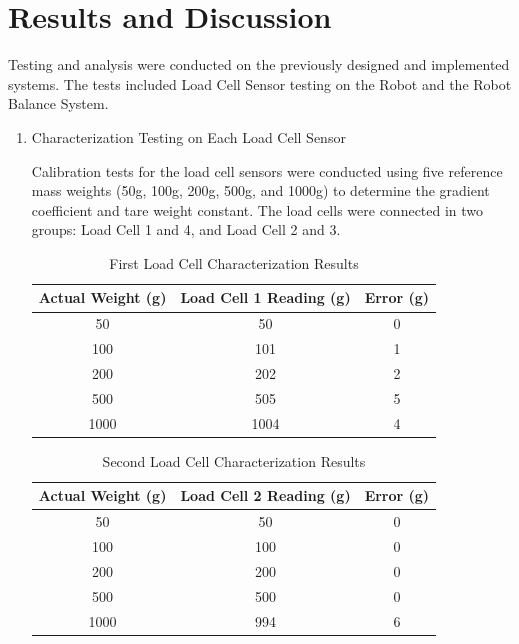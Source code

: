 \section{Results and Discussion}
\label{sec:resultsanddiscussion}

Testing and analysis were conducted on the previously designed and implemented systems. The tests included Load Cell Sensor testing on the Robot and the Robot Balance System.

\begin{enumerate}[label=\Alph*.]

    \item Characterization Testing on Each Load Cell Sensor
    \label{subsec:results-discussion-characterization}

        \hspace*{1em} Calibration tests for the load cell sensors were conducted using five reference mass weights (50g, 100g, 200g, 500g, and 1000g) to determine the gradient coefficient and tare weight constant. The load cells were connected in two groups: Load Cell 1 and 4, and Load Cell 2 and 3.

        \begin{table}[h]
            \centering
            \caption{First Load Cell Characterization Results}
            \begin{tabular}{|c|c|c|}
                \hline
                \textbf{Actual Weight (g)} & \textbf{Load Cell 1 Reading (g)} & \textbf{Error (g)} \\
                \hline
                50    & 50    & 0   \\
                100   & 101   & 1   \\
                200   & 202   & 2   \\
                500   & 505   & 5   \\
                1000  & 1004  & 4   \\
                \hline
            \end{tabular}
            \label{tab:Calibration_Load_Cell_1}
        \end{table}

        \begin{table}[h]
            \centering
            \caption{Second Load Cell Characterization Results}
            \begin{tabular}{|c|c|c|}
                \hline
                \textbf{Actual Weight (g)} & \textbf{Load Cell 2 Reading (g)} & \textbf{Error (g)} \\
                \hline
                50        & 50        & 0   \\
                100       & 100       & 0   \\
                200       & 200       & 0   \\
                500       & 500       & 0   \\
                1000      & 994       & 6   \\           
                \hline
        \end{tabular}
        \label{tab:Calibration_Load_Cell_2}
        \end{table}


\end{enumerate}
